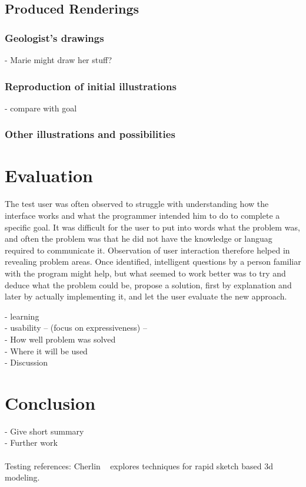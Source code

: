 \documentclass[a4paper,12pt]{report}
\begin{document}
\section{Produced Renderings}
\subsection{Geologist's drawings}
- Marie might draw her stuff?
\subsection{Reproduction of initial illustrations}
- compare with goal\\
\subsection{Other illustrations and possibilities}

\clearpage
\chapter{Evaluation}
\label{sec:eval}
The test user was often observed to struggle with understanding how the interface works and what the programmer intended him to do to complete a specific goal. It was difficult for the user to put into words what the problem was, and often the problem was that he did not have the knowledge or languag required to communicate it. Observation of user interaction therefore helped in revealing problem areas. Once identified, intelligent questions by a person familiar with the program might help, but what seemed to work better was to try and deduce what the problem could be, propose a solution, first by explanation and later by actually implementing it, and let the user evaluate the new approach.


- learning\\
- usability
 -- (focus on expressiveness) -- \\
- How well problem was solved\\
- Where it will be used \\
- Discussion

\clearpage
\chapter{Conclusion}
\label{sec:conclusion}
- Give short summary\\
- Further work\\
\\


Testing references: Cherlin ~\cite{Cherlin:2005:SMF:1090122.1090145} explores techniques for rapid sketch based 3d modeling.


{}

\end{document}
